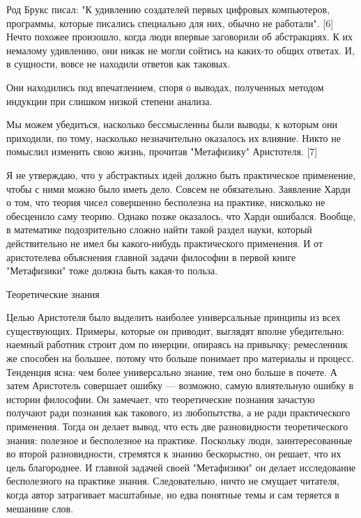 \documentclass[ebook,12pt,oneside,openany]{memoir}
\begin{document}
Род Брукс писал: "К удивлению создателей первых цифровых компьютеров,
программы, которые писались специально для них, обычно не работали".
[6] Нечто похожее произошло, когда люди впервые заговорили об
абстракциях. К их немалому удивлению, они никак не могли сойтись на
каких-то общих ответах. И, в сущности, вовсе не находили ответов как
таковых.

Они находились под впечатлением, споря о выводах, полученных методом
индукции при слишком низкой степени анализа.

Мы можем убедиться, насколько бессмысленны были выводы, к которым они
приходили, по тому, насколько незначительно оказалось их влияние.
Никто не помыслил изменить свою жизнь, прочитав "Метафизику"
Аристотеля. [7]

Я не утверждаю, что у абстрактных идей должно быть практическое
применение, чтобы с ними можно было иметь дело. Совсем не обязательно.
Заявление Харди о том, что теория чисел совершенно бесполезна на
практике, нисколько не обесценило саму теорию. Однако позже оказалось,
что Харди ошибался. Вообще, в математике подозрительно сложно найти
такой раздел науки, который действительно не имел бы какого-нибудь
практического применения. И от аристотелева объяснения главной задачи
философии в первой книге "Метафизики" тоже должна быть какая-то
польза.

Теоретические знания

Целью Аристотеля было выделить наиболее универсальные принципы из всех
существующих. Примеры, которые он приводит, выглядят вполне
убедительно: наемный работник строит дом по инерции, опираясь на
привычку; ремесленник же способен на большее, потому что больше
понимает про материалы и процесс. Тенденция ясна: чем более
универсально знание, тем оно больше в почете. А затем Аристотель
совершает ошибку — возможно, самую влиятельную ошибку в истории
философии. Он замечает, что теоретические познания зачастую получают
ради познания как такового, из любопытства, а не ради практического
применения. Тогда он делает вывод, что есть две разновидности
теоретического знания: полезное и бесполезное на практике. Поскольку
люди, заинтересованные во второй разновидности, стремятся к знанию
бескорыстно, он решает, что их цель благороднее. И главной задачей
своей "Метафизики" он делает исследование бесполезного на практике
знания. Следовательно, ничто не смущает читателя, когда автор
затрагивает масштабные, но едва понятные темы и сам теряется в
мешанине слов.
\end{document}
